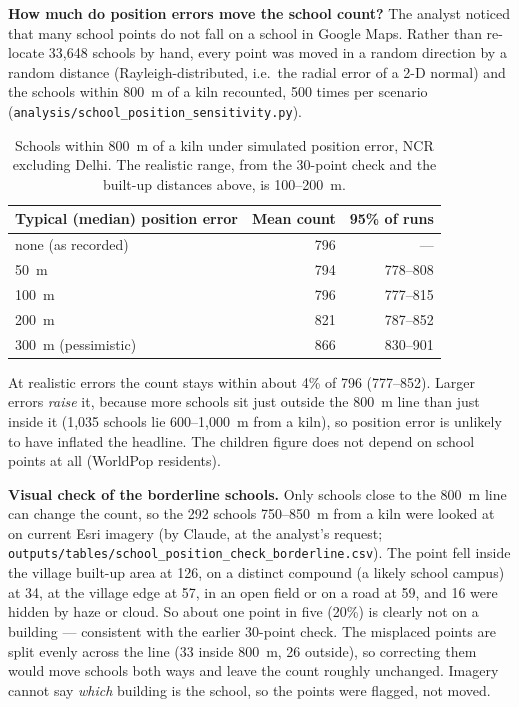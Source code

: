\documentclass[11pt,a4paper]{article}
\begin{document}
\textbf{How much do position errors move the school count?} The analyst noticed
that many school points do not fall on a school in Google Maps. Rather than
re-locate 33{,}648 schools by hand, every point was moved in a random direction
by a random distance (Rayleigh-distributed, i.e.\ the radial error of a 2-D normal)
and the schools within 800~m of a kiln recounted, 500 times per scenario
(\texttt{analysis/school\_position\_sensitivity.py}).

\begin{table}[H]
\centering\small
\begin{tabular}{@{}lrr@{}}
\toprule
Typical (median) position error & Mean count & 95\% of runs \\
\midrule
none (as recorded)  & 796 & --- \\
50~m                & 794 & 778--808 \\
100~m               & 796 & 777--815 \\
200~m               & 821 & 787--852 \\
300~m (pessimistic) & 866 & 830--901 \\
\bottomrule
\end{tabular}
\caption{Schools within 800~m of a kiln under simulated position error, NCR
excluding Delhi. The realistic range, from the 30-point check and the built-up
distances above, is 100--200~m.}
\end{table}

At realistic errors the count stays within about 4\% of 796 (777--852).
Larger errors \emph{raise} it, because more schools sit just outside the 800~m
line than just inside it (1{,}035 schools lie 600--1{,}000~m from a kiln), so
position error is unlikely to have inflated the headline. The children figure does
not depend on school points at all (WorldPop residents).

\textbf{Visual check of the borderline schools.} Only schools close to the 800~m
line can change the count, so the 292 schools 750--850~m from a kiln were looked at
on current Esri imagery (by Claude, at the analyst's request;
\texttt{outputs/tables/school\_position\_check\_borderline.csv}). The point fell
inside the village built-up area at 126, on a distinct compound (a likely school
campus) at 34, at the village edge at 57, in an open field or on a road at 59, and
16 were hidden by haze or cloud. So about one point in five (20\%) is clearly not
on a building --- consistent with the earlier 30-point check. The misplaced points
are split evenly across the line (33 inside 800~m, 26 outside), so correcting them
would move schools both ways and leave the count roughly unchanged. Imagery cannot
say \emph{which} building is the school, so the points were flagged, not moved.
\end{document}

